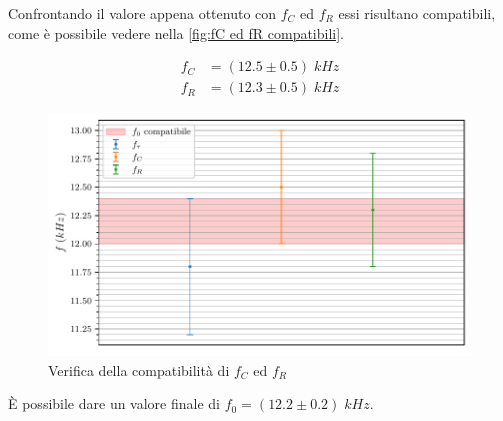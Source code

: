 \documentclass[11pt, a4paper]{article}
\numberwithin{equation}{section} %
\begin{document}
Confrontando il valore appena ottenuto con $f_{C}$ ed $f_{R}$ essi risultano compatibili, come è possibile vedere nella \autoref{fig:fC ed fR compatibili}.

\begin{align*}
    f_{C} &= (12.5 \pm 0.5) \; kHz \\
    f_{R} &= (12.3 \pm 0.5) \; kHz
\end{align*}

\begin{figure}[ht!]
    \includegraphics{f_0_compatibili.pdf}
    \caption{Verifica della compatibilità di $f_{C}$ ed $f_{R}$}
    \label{fig:fC ed fR compatibili}
\end{figure}

\newpage

È possibile dare un valore finale di $f_{0} = (12.2 \pm 0.2) \; kHz$.
\end{document}
